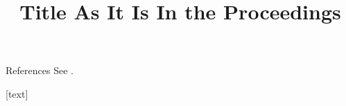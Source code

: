 \documentclass{beamer}
\title[Short Title]{Title As It Is In the Proceedings}
\begin{document}
\appendix

\begin{frame}[allowframebreaks]{References}
    See \cite{landau}.
    
    
    [text]
    
\end{frame}
\end{document}
